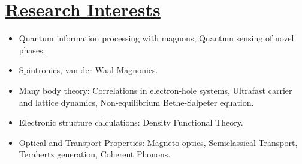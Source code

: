 \documentclass[11pt]{article}
\begin{document}
\section*{\underline{Research Interests}}
\begin{itemize}
\item Quantum information processing with magnons, Quantum sensing of novel phases.
\item Spintronics, van der Waal Magnonics.
\item Many body theory: Correlations in electron-hole systems, Ultrafast carrier and lattice dynamics, Non-equilibrium Bethe-Salpeter equation.
\item Electronic structure calculations: Density Functional Theory.
\item Optical and Transport Properties: Magneto-optics, Semiclassical Transport, Terahertz generation, Coherent Phonons.   
\end{itemize}
\end{document}
